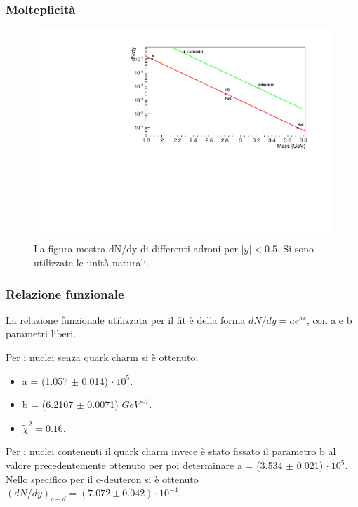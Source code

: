 \documentclass[11pt]{beamer}
\begin{document}
	
	\begin{frame}
		\frametitle{Molteplicità}
		\begin{figure}
			\includegraphics[width=0.9\linewidth]{pictures/first_graph.pdf}
			\caption{La figura mostra dN/dy di differenti adroni per $|y|<$0.5. Si sono utilizzate le unità naturali.}
		\end{figure}
		
	\end{frame}
	
	\begin{frame}
		\frametitle{Relazione funzionale}
		La relazione funzionale utilizzata per il fit è della forma $dN/dy= a e^{bx}$, con a e b parametri liberi. 
		
		Per i nuclei senza quark charm si è ottenuto:
		\begin{itemize}
			\item a = (1.057 $\pm$ 0.014) $\cdot \ 10^5$.
			\item b = (6.2107 $\pm$ 0.0071) $GeV^{-1}$. 
			\item $\tilde{\chi}^2 = 0.16$. 
		\end{itemize}
		Per i nuclei contenenti il quark charm invece è stato fissato il parametro b al valore precedentemente ottenuto per poi determinare a = (3.534 $\pm$ 0.021) $\cdot \ 10^5$.
		Nello specifico per il c-deuteron si è ottenuto $(dN/dy)_{c-d}= (7.072 \pm 0.042) \cdot 10^{-4}$.
	\end{frame}
	
\end{document}
